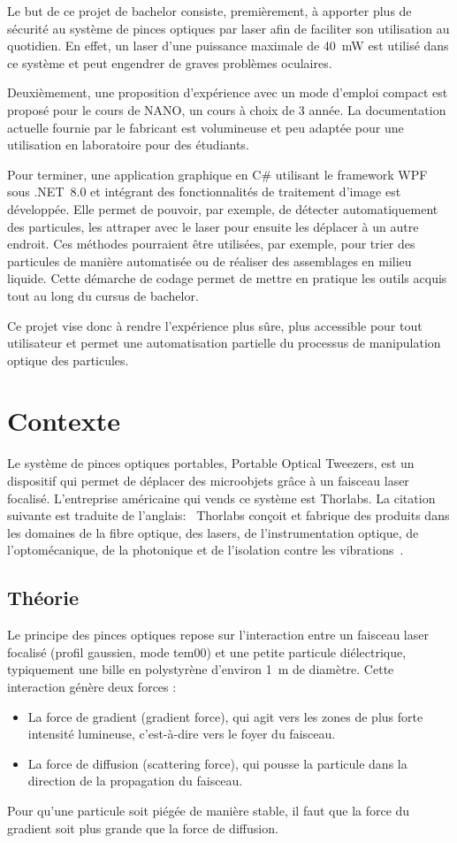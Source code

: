 Le but de ce projet de bachelor consiste, premièrement, à apporter plus de sécurité au système de pinces optiques par laser afin de faciliter son utilisation au quotidien. En effet, un laser d'une puissance maximale de 40~mW est utilisé dans ce système et peut engendrer de graves problèmes oculaires.

Deuxièmement, une proposition d'expérience avec un mode d'emploi compact est proposé pour le cours de NANO, un cours à choix de 3\ieme{} année. La documentation actuelle fournie par le fabricant est volumineuse et peu adaptée pour une utilisation en laboratoire pour des étudiants.

Pour terminer, une application graphique en C\# utilisant le framework WPF sous .NET~8.0 et intégrant des fonctionnalités de traitement d'image est développée. Elle permet de pouvoir, par exemple, de détecter automatiquement des particules, les attraper avec le laser pour ensuite les déplacer à un autre endroit. Ces méthodes pourraient être utilisées, par exemple, pour trier des particules de manière automatisée ou de réaliser des assemblages en milieu liquide. Cette démarche de codage permet de mettre en pratique les outils acquis tout au long du cursus de bachelor.

Ce projet vise donc à rendre l'expérience plus sûre, plus accessible pour tout utilisateur et permet une automatisation partielle du processus de manipulation optique des particules.
\newpage
\section{Contexte}

Le système de pinces optiques portables, Portable Optical Tweezers, est un dispositif qui permet de déplacer des microobjets grâce à un faisceau laser focalisé. L'entreprise américaine qui vends ce système est Thorlabs. La citation suivante est traduite de l'anglais: \guillemotleft{}~Thorlabs conçoit et fabrique des produits dans les domaines de la fibre optique, des lasers, de l'instrumentation optique, de l'optomécanique, de la photonique et de l'isolation contre les vibrations~\guillemotright{}\cite{thorlabsWikipedia}.

\subsection{Théorie}
Le principe des pinces optiques repose sur l'interaction entre un faisceau laser focalisé (profil gaussien, mode \gls{tem00}) et une petite particule diélectrique, typiquement une bille en polystyrène d'environ 1~\textmu m de diamètre. Cette interaction génère deux forces :
\begin{itemize}[label=\textbullet]
    \item La force de gradient (gradient force), qui agit vers les zones de plus forte intensité lumineuse, c'est-à-dire vers le foyer du faisceau.
    \item La force de diffusion (scattering force), qui pousse la particule dans la direction de la propagation du faisceau.
\end{itemize}
Pour qu'une particule soit piégée de manière stable, il faut que la force du gradient soit plus grande que la force de diffusion.

